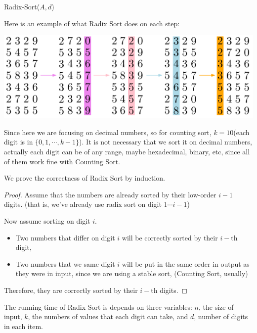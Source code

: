 \begin{spacing}{1.3}
    \begin{algorithm*}
        \caption{Radix-Sort($A,d$)}
    \end{algorithm*}
    Here is an example of what Radix Sort does on each step:
    \begin{center}
        \includegraphics[scale=0.4]{images/06-radix-eg.png}
    \end{center}
    Since here we are focusing on decimal numbers, so for counting sort, 
    $k=10$(each digit is in $\{0,1,\cdots, k-1\}$). It is not necessary that 
    we sort it on decimal numbers, actually each digit can be of any range,
    maybe hexadecimal, binary, etc, since all of them work fine with 
    Counting Sort.

    We prove the correctness of Radix Sort by induction.
    \begin{proof}
        Assume that the numbers are already sorted by their low-order $i-1$ digits.
        (that is, we've already use radix sort on digit $1\cdots i-1$)

        Now assume sorting on digit $i$. 
        \begin{itemize}
            \item Two numbers that differ on digit $i$ will be correctly sorted 
            by their $i-$th digit, 
            \item Two numbers that we same digit $i$ will be put in the same order 
            in output as they were in input, since we are using a stable sort,
            (Counting Sort, usually)
        \end{itemize}
        Therefore, they are correctly sorted by their $i-$th digits.
    \end{proof}

    The running time of Radix Sort is depends on three variables: $n$, the size of input, 
    $k$, the numbers of values that each digit can take, and $d$, number of digits 
    in each item.


\end{spacing}
